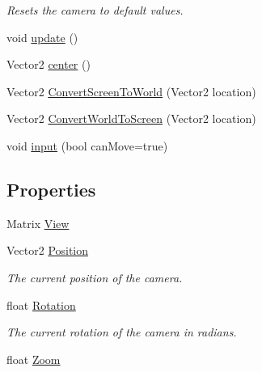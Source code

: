 \begin{DoxyCompactItemize}
\begin{DoxyCompactList}\small\item\em Resets the camera to default values. \end{DoxyCompactList}\item 
void \hyperlink{classgearit_1_1src_1_1editor_1_1_editor_camera_a46b7a87110c20b40c68b0b468d666dac}{update} ()
\item 
Vector2 \hyperlink{classgearit_1_1src_1_1editor_1_1_editor_camera_a4946a20fe1fe894e4b0f9bf200b7faf1}{center} ()
\item 
Vector2 \hyperlink{classgearit_1_1src_1_1editor_1_1_editor_camera_a4451d09612304490115d8ac50ec8ac79}{Convert\+Screen\+To\+World} (Vector2 location)
\item 
Vector2 \hyperlink{classgearit_1_1src_1_1editor_1_1_editor_camera_a84ffacf12cf90fd76f883aa843feeeff}{Convert\+World\+To\+Screen} (Vector2 location)
\item 
void \hyperlink{classgearit_1_1src_1_1editor_1_1_editor_camera_a57a152a668bd8c2b40f4cae448265b52}{input} (bool can\+Move=true)
\end{DoxyCompactItemize}
\subsection*{Properties}
\begin{DoxyCompactItemize}
\item 
Matrix \hyperlink{classgearit_1_1src_1_1editor_1_1_editor_camera_aa6707ae235d5de27a6124371892da70e}{View}
\item 
Vector2 \hyperlink{classgearit_1_1src_1_1editor_1_1_editor_camera_a8c16884dbf241d27507a523d3a09aeea}{Position}
\begin{DoxyCompactList}\small\item\em The current position of the camera. \end{DoxyCompactList}\item 
float \hyperlink{classgearit_1_1src_1_1editor_1_1_editor_camera_a215303d1d3853e0e9f154474e7345804}{Rotation}
\begin{DoxyCompactList}\small\item\em The current rotation of the camera in radians. \end{DoxyCompactList}\item 
float \hyperlink{classgearit_1_1src_1_1editor_1_1_editor_camera_a1bff1180b0422813073c351e6ab4d68a}{Zoom}
\end{DoxyCompactItemize}


